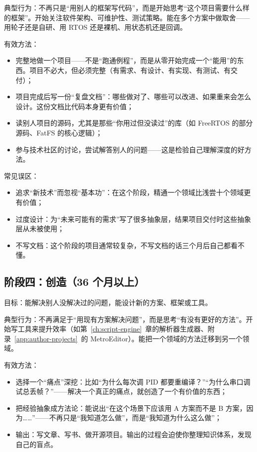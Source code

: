 典型行为：不再只是“用别人的框架写代码”，而是开始思考“这个项目需要什么样的框架”。开始关注软件架构、可维护性、测试策略。能在多个方案中做取舍——用轮子还是自研、用 RTOS 还是裸机、用状态机还是回调。

有效方法：
\begin{itemize}
	\item 完整地做一个项目——不是“跑通例程”，而是从零开始完成一个“能用”的东西。项目不必大，但必须完整（有需求、有设计、有实现、有测试、有交付）；
	\item 项目完成后写一份“复盘文档”：哪些做对了、哪些可以改进、如果重来会怎么设计。这份文档比代码本身更有价值；
	\item 读别人项目的源码，尤其是那些“你用过但没读过”的库（如 FreeRTOS 的部分源码、FatFS 的核心逻辑）；
	\item 参与技术社区的讨论，尝试解答别人的问题——这是检验自己理解深度的好方法。
\end{itemize}

常见误区：
\begin{itemize}
	\item 追求“新技术”而忽视“基本功”：在这个阶段，精通一个领域比浅尝十个领域更有价值；
	\item 过度设计：为“未来可能有的需求”写了很多抽象层，结果项目交付时这些抽象层从未被使用；
	\item 不写文档：这个阶段的项目通常较复杂，不写文档的话三个月后自己都看不懂。
\end{itemize}

\subsection*{阶段四：创造（36 个月以上）}

目标：能解决别人没解决过的问题，能设计新的方案、框架或工具。

典型行为：不再满足于“用现有方案解决问题”，而是思考“有没有更好的方法”。开始写工具来提升效率（如第~\ref{ch:script-engine}~章的解析器生成器、附录~\ref{app:author-projects}~的 MetroEditor）。能把一个领域的方法迁移到另一个领域。

有效方法：
\begin{itemize}
	\item 选择一个“痛点”深挖：比如“为什么每次调 PID 都要重编译？”“为什么串口调试总丢帧？”——解决一个真正的痛点，就创造了一个有价值的东西；
	\item 把经验抽象成方法论：能说出“在这个场景下应该用 A 方案而不是 B 方案，因为……”——不再只是“我知道怎么做”，而是“我知道为什么这么做”；
	\item 输出：写文章、写书、做开源项目。输出的过程会迫使你整理知识体系，发现自己的盲点。
\end{itemize}

